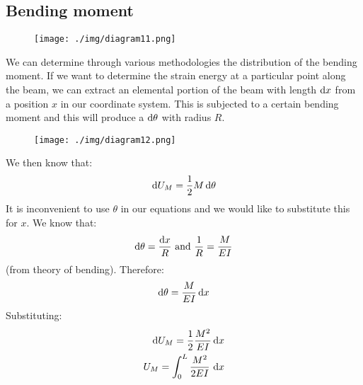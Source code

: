 \subsection{Bending moment}
\begin{figure}[H]
  \centering
  \texttt{[image: ./img/diagram11.png]}
  \caption{}
\end{figure}
We can determine through various methodologies the distribution of the bending moment. If we want to determine the strain energy at a particular point along the beam, we can extract an elemental portion of the beam with length $\dif x$ from a position $x$ in our coordinate system. This is subjected to a certain bending moment and this will produce a $\dif \theta$ with radius $R$.
\begin{figure}[H]
  \centering
  \texttt{[image: ./img/diagram12.png]}
  \caption{}
\end{figure}
We then know that:
\begin{equation}
  \dif U_M = \frac{1}{2} M \dif \theta
\end{equation}
It is inconvenient to use $\theta$ in our equations and we would like to substitute this for $x$. We know that:
\begin{align}
  \dif \theta = \frac{\dif x}{R} \textrm{ and } \frac{1}{R} = \frac{M}{EI}
\end{align}
(from theory of bending). Therefore:
\begin{equation}
  \dif \theta = \frac{M}{EI} \dif x
\end{equation}
Substituting:
\begin{align}
  \dif U_M = \frac{1}{2} \frac{M^2}{EI} \dif x \\
  U_M = \int_0^L \frac{M^2}{2EI}\, \dif x
\end{align}
